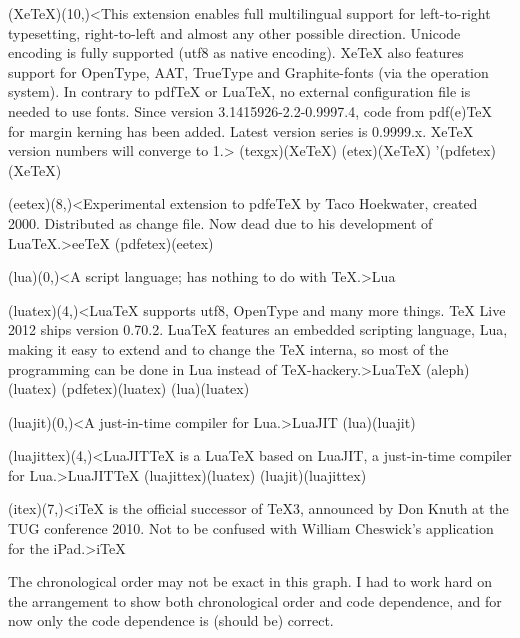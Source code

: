 {	\tonode[\vip](XeTeX)(10,\layer)<This extension enables full multilingual support for left-to-right typesetting, right-to-left and almost any other possible direction. Unicode encoding is fully supported (utf8 as native encoding). XeTeX also features support for OpenType, AAT, TrueType and Graphite-fonts (via the operation system). In contrary to pdfTeX or LuaTeX, no external configuration file is needed to use fonts. Since version 3.1415926-2.2-0.9997.4, code from pdf(e)TeX for margin kerning has been added. Latest version series is 0.9999.x. XeTeX version numbers will converge to 1.>{\XeTeX}
		\todraw(texgx)(XeTeX)
		\todraw*(etex)(XeTeX)
		\todraw'(pdfetex)(XeTeX)
	
	\steplayer[-2]

	\tonode[\experimental](eetex)(8,\layer)<Experimental extension to pdfeTeX by Taco Hoekwater, created 2000. Distributed as change file. Now dead due to his development of LuaTeX.>{ee\TeX}
		\todraw(pdfetex)(eetex)
	
	\steplayer[-1]

	\tonode[\program](lua)(0,\layer)<A script language; has nothing to do with TeX.>{Lua}
	
	\tonode[\vip](luatex)(4,\layer)<LuaTeX supports utf8, OpenType and many more things. TeX Live 2012 ships version 0.70.2. LuaTeX features an embedded scripting language, Lua, making it easy to extend and to change the TeX interna, so most of the programming can be done in Lua instead of TeX-hackery.>{Lua\TeX}
		\todraw(aleph)(luatex)
		\todraw*(pdfetex)(luatex)
		\todraw[dashed](lua)(luatex)

	\steplayer[-2]
	\tonode[\program](luajit)(0,\layer)<A just-in-time compiler for Lua.>{LuaJIT}
		\todraw(lua)(luajit)

	\tonode[\experimental](luajittex)(4,\layer)<LuaJITTeX is a LuaTeX based on LuaJIT, a just-in-time compiler for Lua.>{LuaJIT\TeX}
		\todraw(luajittex)(luatex)
		\todraw[dashed](luajit)(luajittex)

	\steplayer[-2.5]
	\tonode[\experimental](itex)(7,\layer)<iTeX is the official successor of TeX3, announced by Don Knuth at the TUG conference 2010. Not to be confused with William Cheswick's application for the iPad.>{i\TeX}
}
\vfill

{\flushleft The chronological order may not be exact in this graph. I had to work hard on the arrangement to show both chronological order and code dependence, and for now only the code dependence is (should be) correct.

} 

